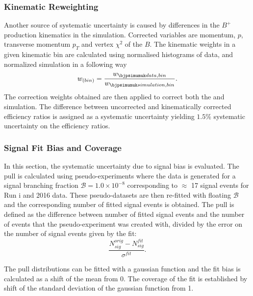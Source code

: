 \subsubsection{Kinematic Reweighting}
Another source of systematic uncertainty is caused by differences in the $B^{+}$ production kinematics in the simulation. Corrected variables are momentum, $p$, transverse momentum $p_{T}$ and vertex $\chi^{2}$ of the $B$. The kinematic weights in a given kinematic bin are calculated using normalised histograms of \bjpsimumuk data, and normalized \bjpsimumuk simulation in a following way
\begin{equation}
w_{(bin)} =  \frac{w_{\bjpsimumuk data,bin}}{w_{\bjpsimumuk simulation,bin}}.
\end{equation}
The correction weights obtained are then applied to correct both the \bjpsimumuk and \Bmumumu simulation. The difference between uncorrected and kinematically corrected efficiency ratios is assigned as a systematic uncertainty yielding $1.5\%$ systematic uncertainty on the efficiency ratios.

\subsubsection{Signal Fit Bias and Coverage}
In this section, the systematic uncertainty due to signal bias is evaluated. The pull is calculated using pseudo-experiments where the data is generated for a signal branching fraction $\mathcal{B}= 1.0\times 10^{-8}$ corresponding to $\approx$ 17 signal events for Run \Rn{1} and 2016 data.
These pseudo-datasets are then re-fitted with floating $\mathcal{B}$ and the corresponding number of fitted signal events is obtained. The pull is defined as the difference between number of fitted signal events and the number of events that the pseudo-experiment was created with, divided by the error on the number of signal events given by the fit:
\begin{equation}
\frac{N^{orig}_{sig}-N^{fit}_{sig}}{\sigma^{fit}}.
\end{equation}

The pull distributions can be fitted with a gaussian function and the fit bias is calculated as a shift of the mean from 0. The coverage of the fit is established by shift of the standard deviation of the gaussian function from 1.

